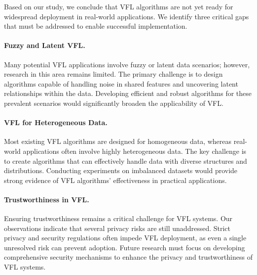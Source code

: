 Based on our study, we conclude that VFL algorithms are not yet ready for widespread deployment in real-world applications. We identify three critical gaps that must be addressed to enable successful implementation.

\paragraph{Fuzzy and Latent VFL.}  
Many potential VFL applications involve fuzzy or latent data scenarios; however, research in this area remains limited. The primary challenge is to design algorithms capable of handling noise in shared features and uncovering latent relationships within the data. Developing efficient and robust algorithms for these prevalent scenarios would significantly broaden the applicability of VFL.

\paragraph{VFL for Heterogeneous Data.}  
Most existing VFL algorithms are designed for homogeneous data, whereas real-world applications often involve highly heterogeneous data. The key challenge is to create algorithms that can effectively handle data with diverse structures and distributions. Conducting experiments on imbalanced datasets would provide strong evidence of VFL algorithms' effectiveness in practical applications.

\paragraph{Trustworthiness in VFL.}  
Ensuring trustworthiness remains a critical challenge for VFL systems. Our observations indicate that several privacy risks are still unaddressed. Strict privacy and security regulations often impede VFL deployment, as even a single unresolved risk can prevent adoption. Future research must focus on developing comprehensive security mechanisms to enhance the privacy and trustworthiness of VFL systems.  
